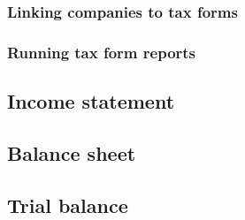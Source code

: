 \subsubsection{Linking companies to tax forms}
\label{subsubsec-business-processes-accounting-reporting-tax-linking-taxforms}

\subsubsection{Running tax form reports}
\label{subsubsec-business-processes-accounting-reporting-tax-running-taxforms}


\subsection{Income statement}
\label{subsec-business-processes-accounting-reporting-result}


\subsection{Balance sheet}
\label{subsec-business-processes-accounting-reporting-balance}

\subsection{Trial balance}
\label{subsec-business-processes-accounting-reporting-trial-balance}

